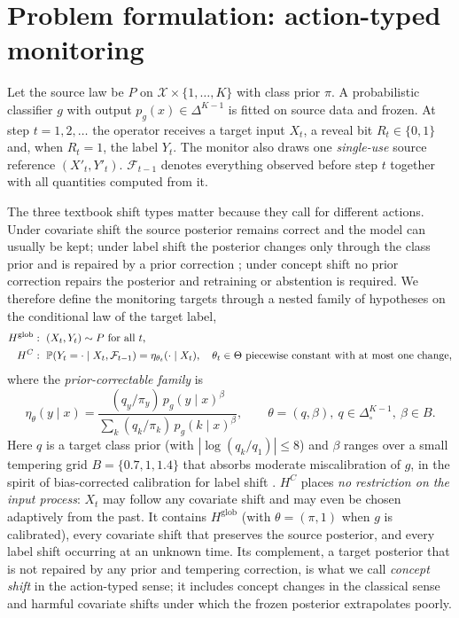 \section{Problem formulation: action-typed monitoring}
\label{sec:problem}

Let the source law be $P$ on $\mathcal X\times\{1,\dots,K\}$ with class prior $\pi$. A probabilistic classifier $g$ with output $p_g(x)\in\Delta^{K-1}$ is fitted on source data and frozen. At step $t=1,2,\dots$ the operator receives a target input $X_t$, a reveal bit $R_t\in\{0,1\}$ and, when $R_t=1$, the label $Y_t$. The monitor also draws one \emph{single-use} source reference $(X'_t,Y'_t)$. $\mathcal F_{t-1}$ denotes everything observed before step $t$ together with all quantities computed from it.

The three textbook shift types matter because they call for different actions. Under covariate shift the source posterior remains correct and the model can usually be kept; under label shift the posterior changes only through the class prior and is repaired by a prior correction \citep{saerens2002,lipton2018,alexandari2020}; under concept shift no prior correction repairs the posterior and retraining or abstention is required. We therefore define the monitoring targets through a nested family of hypotheses on the conditional law of the target label,
\begin{align*}
H^{\mathrm{glob}}&:\ (X_t,Y_t)\sim P \text{ for all } t,\\
H^{C}&:\ \mathbb{P}(Y_t=\cdot\mid X_t,\mathcal F_{t-1})=\eta_{\theta_t}(\cdot\mid X_t),\quad \theta_t\in\Theta \text{ piecewise constant with at most one change,}
\end{align*}
where the \emph{prior-correctable family} is
\begin{equation}
\eta_{\theta}(y\mid x)=\frac{(q_y/\pi_y)\,p_g(y\mid x)^{\beta}}{\sum_{k}(q_k/\pi_k)\,p_g(k\mid x)^{\beta}},\qquad \theta=(q,\beta),\ q\in\Delta^{K-1}_{\circ},\ \beta\in B.
\label{eq:family}
\end{equation}
Here $q$ is a target class prior (with $|\log(q_k/q_1)|\le 8$) and $\beta$ ranges over a small tempering grid $B=\{0.7,1,1.4\}$ that absorbs moderate miscalibration of $g$, in the spirit of bias-corrected calibration for label shift \citep{alexandari2020}. $H^{C}$ places \emph{no restriction on the input process}: $X_t$ may follow any covariate shift and may even be chosen adaptively from the past. It contains $H^{\mathrm{glob}}$ (with $\theta=(\pi,1)$ when $g$ is calibrated), every covariate shift that preserves the source posterior, and every label shift occurring at an unknown time. Its complement, a target posterior that is not repaired by any prior and tempering correction, is what we call \emph{concept shift} in the action-typed sense; it includes concept changes in the classical sense and harmful covariate shifts under which the frozen posterior extrapolates poorly.


